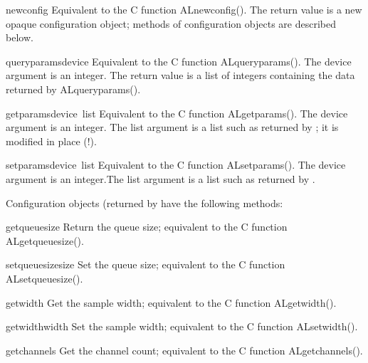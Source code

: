 \begin{funcdesc}{newconfig}{}
Equivalent to the C function ALnewconfig().  The return value is a new
opaque configuration object; methods of configuration objects are
described below.
\end{funcdesc}

\begin{funcdesc}{queryparams}{device}
Equivalent to the C function ALqueryparams().  The device argument is
an integer.  The return value is a list of integers containing the
data returned by ALqueryparams().
\end{funcdesc}

\begin{funcdesc}{getparams}{device\, list}
Equivalent to the C function ALgetparams().  The device argument is an
integer.  The list argument is a list such as returned by
; it is modified in place (!).
\end{funcdesc}

\begin{funcdesc}{setparams}{device\, list}
Equivalent to the C function ALsetparams().  The device argument is an
integer.The list argument is a list such as returned by
.
\end{funcdesc}

Configuration objects (returned by  have the
following methods:

\renewcommand{\indexsubitem}{(audio configuration object method)}
\begin{funcdesc}{getqueuesize}{}
Return the queue size; equivalent to the C function ALgetqueuesize().
\end{funcdesc}

\begin{funcdesc}{setqueuesize}{size}
Set the queue size; equivalent to the C function ALsetqueuesize().
\end{funcdesc}

\begin{funcdesc}{getwidth}{}
Get the sample width; equivalent to the C function ALgetwidth().
\end{funcdesc}

\begin{funcdesc}{getwidth}{width}
Set the sample width; equivalent to the C function ALsetwidth().
\end{funcdesc}

\begin{funcdesc}{getchannels}{}
Get the channel count; equivalent to the C function ALgetchannels().
\end{funcdesc}

